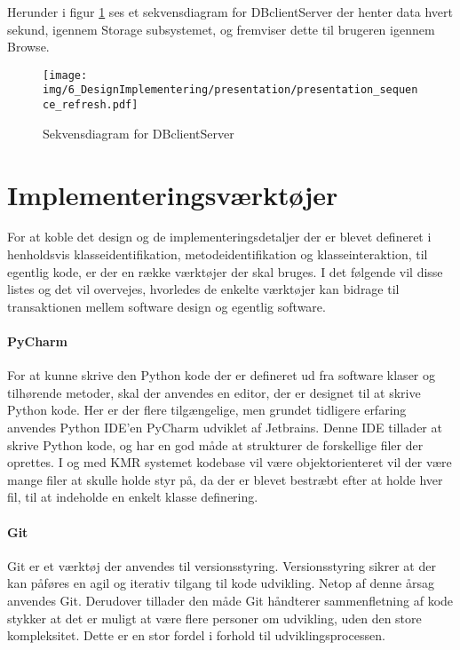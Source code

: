 \begin{appendices}
Herunder i figur \ref{fig:presentation_dbclientserver_sequence} ses et sekvensdiagram for DBclientServer der henter data hvert sekund, igennem Storage subsystemet, og fremviser dette til brugeren igennem Browse.
\begin{figure}[H]
	\centering
	\texttt{[image: img/6\_DesignImplementering/presentation/presentation\_sequence\_refresh.pdf]}
	\caption{Sekvensdiagram for DBclientServer}
	\label{fig:presentation_dbclientserver_sequence}
\end{figure}

\pagebreak

\chapter{Implementeringsværktøjer} \label{appendix::implementeringsvaerktoojer}

For at koble det design og de implementeringsdetaljer der er blevet defineret i henholdsvis klasseidentifikation, metodeidentifikation og klasseinteraktion, til egentlig kode, er der en række værktøjer der skal bruges. I det følgende vil disse listes og det vil overvejes, hvorledes de enkelte værktøjer kan bidrage til transaktionen mellem software design og egentlig software. 

\subsubsection{PyCharm}
For at kunne skrive den Python kode der er defineret ud fra software klaser og tilhørende metoder, skal der anvendes en editor, der er designet til at skrive Python kode. Her er der flere tilgængelige, men grundet tidligere erfaring anvendes Python IDE'en PyCharm udviklet af Jetbrains. Denne IDE tillader at skrive Python kode, og har en god måde at strukturer de forskellige filer der oprettes. I og med KMR systemet kodebase vil være objektorienteret vil der være mange filer at skulle holde styr på, da der er blevet bestræbt efter at holde hver fil, til at indeholde en enkelt klasse definering.

\subsubsection{Git}
Git er et værktøj der anvendes til versionsstyring. Versionsstyring sikrer at der kan påføres en agil og iterativ tilgang til kode udvikling. Netop af denne årsag anvendes Git. Derudover tillader den måde Git håndterer sammenfletning af kode stykker at det er muligt at være flere personer om udvikling, uden den store kompleksitet. Dette er en stor fordel i forhold til udviklingsprocessen.


\end{appendices}
